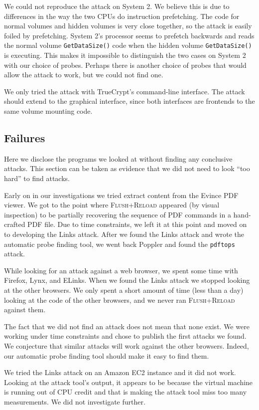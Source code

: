 \documentclass[letterpaper,twocolumn,10pt]{article}
\begin{document}
We could not reproduce the attack on System 2. We believe this is due to
differences in the way the two CPUs do instruction prefetching. The code for
normal volumes and hidden volumes is very close together, so the attack is
easily foiled by prefetching. System 2's processor seems to prefetch backwards
and reads the normal volume \texttt{GetDataSize()} code when the hidden volume
\texttt{GetDataSize()} is executing. This makes it impossible to distinguish the
two cases on System 2 with our choice of probes. Perhaps there is another choice
of probes that would allow the attack to work, but we could not find one.

We only tried the attack with TrueCrypt's command-line interface. The attack
should extend to the graphical interface, since both interfaces are frontends to
the same volume mounting code. 

\subsection{Failures}
\label{sec:failures}

Here we disclose the programs we looked at without finding any conclusive
attacks. This section can be taken as evidence that we did not need to look
``too hard'' to find attacks.

Early on in our investigations we tried extract content from the Evince PDF
viewer. We got to the point where \textsc{Flush+Reload} appeared (by visual
inspection) to be partially recovering the sequence of PDF commands in
a hand-crafted PDF file. Due to time constraints, we left it at this point and
moved on to developing the Links attack. After we found the Links attack and
wrote the automatic probe finding tool, we went back Poppler and found the
\texttt{pdftops} attack.

While looking for an attack against a web browser, we spent some time with
Firefox, Lynx, and ELinks. When we found the Links attack we stopped looking at
the other browsers. We only spent a short amount of time (less than a day)
looking at the code of the other browsers, and we never ran
\textsc{Flush+Reload} against them.

The fact that we did not find an attack does not mean that none exist. We were
working under time constraints and chose to publish the first attacks we found.
We conjecture that similar attacks will work against the other browsers. Indeed,
our automatic probe finding tool should make it easy to find them.

We tried the Links attack on an Amazon EC2 instance and it did not work. Looking
at the attack tool's output, it appears to be because the virtual machine is
running out of CPU credit and that is making the attack tool miss too many
measurements. We did not investigate further.
\end{document}
